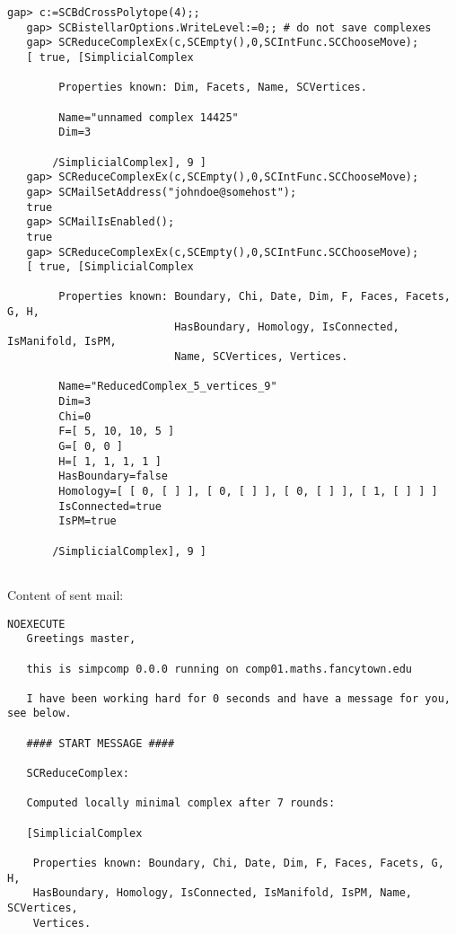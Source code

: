 \documentclass[a4paper,11pt]{report}
\begin{document}
{{{ 
\begin{Verbatim}[commandchars=!|J,fontsize=\small,frame=single,label=Example]
   gap> c:=SCBdCrossPolytope(4);;
   gap> SCBistellarOptions.WriteLevel:=0;; # do not save complexes                      
   gap> SCReduceComplexEx(c,SCEmpty(),0,SCIntFunc.SCChooseMove);
   [ true, [SimplicialComplex
       
        Properties known: Dim, Facets, Name, SCVertices.
       
        Name="unnamed complex 14425"
        Dim=3
       
       /SimplicialComplex], 9 ]
   gap> SCReduceComplexEx(c,SCEmpty(),0,SCIntFunc.SCChooseMove);
   gap> SCMailSetAddress("johndoe@somehost");   
   true
   gap> SCMailIsEnabled();                     
   true
   gap> SCReduceComplexEx(c,SCEmpty(),0,SCIntFunc.SCChooseMove);
   [ true, [SimplicialComplex
       
        Properties known: Boundary, Chi, Date, Dim, F, Faces, Facets, G, H, 
                          HasBoundary, Homology, IsConnected, IsManifold, IsPM, 
                          Name, SCVertices, Vertices.
       
        Name="ReducedComplex_5_vertices_9"
        Dim=3
        Chi=0
        F=[ 5, 10, 10, 5 ]
        G=[ 0, 0 ]
        H=[ 1, 1, 1, 1 ]
        HasBoundary=false
        Homology=[ [ 0, [ ] ], [ 0, [ ] ], [ 0, [ ] ], [ 1, [ ] ] ]
        IsConnected=true
        IsPM=true
       
       /SimplicialComplex], 9 ]
   
\end{Verbatim}
 Content of sent mail: 
\begin{Verbatim}[commandchars=@|J,fontsize=\small,frame=single,label=Example]
   NOEXECUTE
   Greetings master,
   
   this is simpcomp 0.0.0 running on comp01.maths.fancytown.edu
  
   I have been working hard for 0 seconds and have a message for you, see below.
   
   #### START MESSAGE ####
   
   SCReduceComplex:
   
   Computed locally minimal complex after 7 rounds:
   
   [SimplicialComplex
   
    Properties known: Boundary, Chi, Date, Dim, F, Faces, Facets, G, H,
    HasBoundary, Homology, IsConnected, IsManifold, IsPM, Name, SCVertices,
    Vertices.
   

\end{Verbatim}}}}
\end{document}
